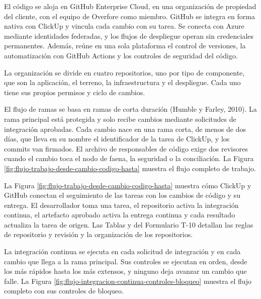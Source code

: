 \documentclass[subdoc]{../../comun/overfore}
\begin{document}
El código se aloja en GitHub Enterprise Cloud, en una organización de propiedad del cliente, con el equipo de Overfore como miembro. GitHub se integra en forma nativa con ClickUp y vincula cada cambio con su tarea. Se conecta con Azure mediante identidades federadas, y los flujos de despliegue operan sin credenciales permanentes. Además, reúne en una sola plataforma el control de versiones, la automatización con GitHub Actions y los controles de seguridad del código.

La organización se divide en cuatro repositorios, uno por tipo de componente, que son la aplicación, el terreno, la infraestructura y el despliegue. Cada uno tiene sus propios permisos y ciclo de cambios.

El flujo de ramas se basa en ramas de corta duración (Humble y Farley, 2010). La rama principal está protegida y solo recibe cambios mediante solicitudes de integración aprobadas. Cada cambio nace en una rama corta, de menos de dos días, que lleva en su nombre el identificador de la tarea de ClickUp, y los commits van firmados. El archivo de responsables de código exige dos revisores cuando el cambio toca el nodo de faena, la seguridad o la conciliación. La Figura \ref{fig:flujo-trabajo-desde-cambio-codigo-hasta} muestra el flujo completo de trabajo.

La Figura \ref{fig:flujo-trabajo-desde-cambio-codigo-hasta} muestra cómo ClickUp y GitHub conectan el seguimiento de las tareas con los cambios de código y su entrega. El desarrollador toma una tarea, el repositorio activa la integración continua, el artefacto aprobado activa la entrega continua y cada resultado actualiza la tarea de origen. Las Tablas  y  del Formulario T-10 detallan las reglas de repositorio y revisión y la organización de los repositorios.

La integración continua se ejecuta en cada solicitud de integración y en cada cambio que llega a la rama principal. Sus controles se ejecutan en orden, desde los más rápidos hasta los más extensos, y ninguno deja avanzar un cambio que falle. La Figura \ref{fig:flujo-integracion-continua-controles-bloqueo} muestra el flujo completo con sus controles de bloqueo.
\end{document}
